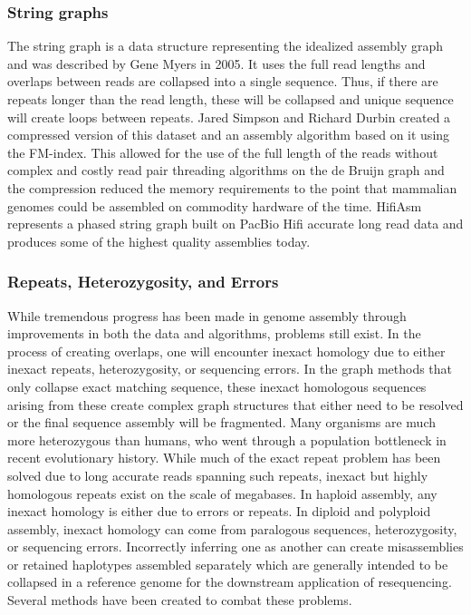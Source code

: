 \subsubsection{String graphs}

\par{
The string graph is a data structure representing the idealized assembly graph and was described by Gene Myers in 2005\cite{Myers2005}. It uses the full read lengths and overlaps between reads are collapsed into a single sequence. Thus, if there are repeats longer than the read length, these will be collapsed and unique sequence will create loops between repeats. Jared Simpson and Richard Durbin created a compressed version of this dataset and an assembly algorithm based on it using the FM-index\cite{fmindex2}\cite{stringfm}\cite{SGA}. This allowed for the use of the full length of the reads without complex and costly read pair threading algorithms on the de Bruijn graph and the compression reduced the memory requirements to the point that mammalian genomes could be assembled on commodity hardware of the time. HifiAsm represents a phased string graph built on PacBio Hifi accurate long read data\cite{hifiasm} and produces some of the highest quality assemblies today.
}


\subsubsection{Repeats, Heterozygosity, and Errors}

\par{
While tremendous progress has been made in genome assembly through improvements in both the data and algorithms, problems still exist. In the process of creating overlaps, one will encounter inexact homology due to either inexact repeats, heterozygosity, or sequencing errors. In the graph methods that only collapse exact matching sequence, these inexact homologous sequences arising from these create complex graph structures that either need to be resolved or the final sequence assembly will be fragmented\cite{assemblyissues}. Many organisms are much more heterozygous than humans, who went through a population bottleneck in recent evolutionary history\cite{bottleneck}. While much of the exact repeat problem has been solved due to long accurate reads spanning such repeats, inexact but highly homologous repeats exist on the scale of megabases\cite{segmentaldups}. In haploid assembly, any inexact homology is either due to errors or repeats. In diploid and polyploid assembly, inexact homology can come from paralogous sequences, heterozygosity, or sequencing errors. Incorrectly inferring one as another can create misassemblies or retained haplotypes assembled separately which are generally intended to be collapsed in a reference genome for the downstream application of resequencing. Several methods have been created to combat these problems.
}
